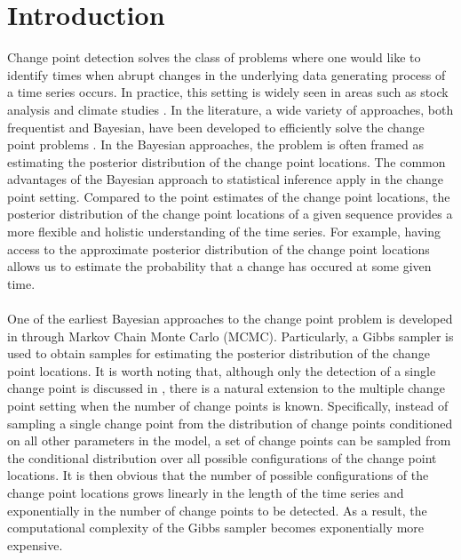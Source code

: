 

\section{Introduction}

Change point detection solves the class of problems where one would like to identify times when abrupt changes in the underlying data generating process of a time series occurs. In practice, this setting is widely seen in areas such as stock analysis and climate studies \cite{chen1997testing,elsner2004detecting}. In the literature, a wide variety of approaches, both frequentist and Bayesian, have been developed to efficiently solve the change point problems \cite{killick2012optimal,carlin1992hierarchical}. In the Bayesian approaches, the problem is often framed as estimating the posterior distribution of the change point locations. The common advantages of the Bayesian approach to statistical inference apply in the change point setting. Compared to the point estimates of the change point locations, the posterior distribution of the change point locations of a given sequence provides a more flexible and holistic understanding of the time series. For example, having access to the approximate posterior distribution of the change point locations allows us to estimate the probability that a change has occured at some given time.\\\\
One of the earliest Bayesian approaches to the change point problem is developed in \cite{carlin1992hierarchical} through Markov Chain Monte Carlo (MCMC). Particularly, a Gibbs sampler is used to obtain samples for estimating the posterior distribution of the change point locations. It is worth noting that, although only the detection of a single change point is discussed in \cite{carlin1992hierarchical}, there is a natural extension to the multiple change point setting when the number of change points is known. Specifically, instead of sampling a single change point from the distribution of change points conditioned on all other parameters in the model, a set of change points can be sampled from the conditional distribution over all possible configurations of the change point locations. It is then obvious that the number of possible configurations of the change point locations grows linearly in the length of the time series and exponentially in the number of change points to be detected. As a result, the computational complexity of the Gibbs sampler becomes exponentially more expensive.\\\\

